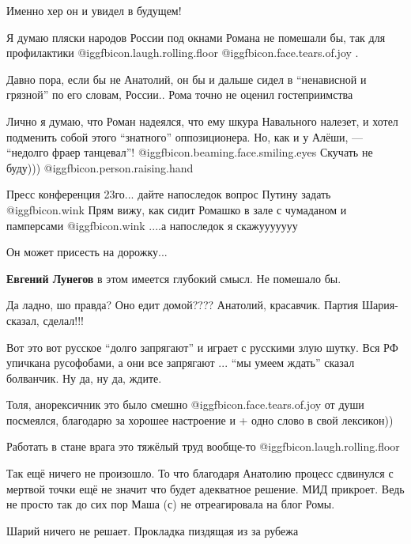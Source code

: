 \begin{itemize}
Именно хер он и увидел в будущем!

Я думаю пляски народов России под окнами Романа не помешали бы, так для профилактики  @igg{fbicon.laugh.rolling.floor}  @igg{fbicon.face.tears.of.joy} .

Давно пора, если бы не Анатолий, он бы и дальше сидел в \enquote{ненависной и грязной} по его словам, России.. Рома точно не оценил гостеприимства

Лично я думаю, что Роман надеялся, что ему шкура Навального налезет, и хотел подменить собой этого \enquote{знатного} оппозиционера.
Но, как и у Алёши, — \enquote{недолго фраер танцевал}!  @igg{fbicon.beaming.face.smiling.eyes} 
Скучать не буду)))  @igg{fbicon.person.raising.hand} 

Пресс конференция 23го... дайте напоследок вопрос Путину задать  @igg{fbicon.wink} 
Прям вижу, как сидит Ромашко в зале с чумаданом и памперсами  @igg{fbicon.wink} 
....а напоследок я скажууууууу

Он может присесть на дорожку...

\textbf{Евгений Лунегов} в этом имеется глубокий смысл. Не помешало бы.

Да ладно, шо правда? Оно едит домой???? Анатолий, красавчик.
Партия Шария-сказал, сделал!!!


Вот это вот русское \enquote{долго запрягают} и играет с русскими злую шутку. Вся РФ
упичкана русофобами, а они все запрягают ... \enquote{мы умеем ждать} сказал болванчик.
Ну да, ну да, ждите.


Толя, анорексичник это было смешно  @igg{fbicon.face.tears.of.joy}  от души
посмеялся, благодарю за хорошее настроение и + одно слово в свой лексикон))


Работать в стане врага это тяжёлый труд вообще-то
@igg{fbicon.laugh.rolling.floor} 


Так ещё ничего не произошло. То что благодаря Анатолию процесс сдвинулся с
мертвой точки ещё не значит что будет адекватное решение. МИД прикроет. Ведь не
просто так до сих пор Маша (с) не отреагировала на блог Ромы.


Шарий ничего не решает. Прокладка пиздящая из за рубежа


\end{itemize}
